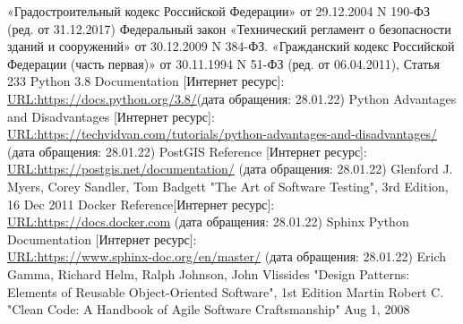 \begin{thebibliography}{8}
	«Градостроительный кодекс Российской Федерации» от 29.12.2004 N 190-ФЗ (ред. от 31.12.2017)
	Федеральный закон «Технический регламент о безопасности зданий и сооружений» от 30.12.2009 N 384-ФЗ.
	«Гражданский кодекс Российской Федерации (часть первая)» от 30.11.1994 N 51-ФЗ (ред. от 06.04.2011), Статья 233
	 Python 3.8 Documentation [Интернет ресурс]:\\
	\url{URL:https://docs.python.org/3.8/}(дата обращения: 28.01.22)
	 Python Advantages and Disadvantages [Интернет ресурс]:\\
	\url{URL:https://techvidvan.com/tutorials/python-advantages-and-disadvantages/} (дата обращения: 28.01.22)
	 PostGIS Reference [Интернет ресурс]:\\
	\url{URL:https://postgis.net/documentation/} (дата обращения: 28.01.22)
	Glenford J. Myers, Corey Sandler, Tom Badgett "The Art of Software Testing", 3rd Edition, 16 Dec 2011
	 Docker Reference[Интернет ресурс]:\\
	\url{URL:https://docs.docker.com} (дата обращения: 28.01.22)
	 Sphinx Python Documentation [Интернет ресурс]:\\
	\url{URL:https://www.sphinx-doc.org/en/master/} (дата обращения: 28.01.22)
	Erich Gamma, Richard Helm, Ralph Johnson, John Vlissides
	"Design Patterns: Elements of Reusable Object-Oriented Software", 1st Edition
	Martin Robert C. "Clean Code: A Handbook of Agile Software Craftsmanship" Aug 1, 2008
\end{thebibliography}
